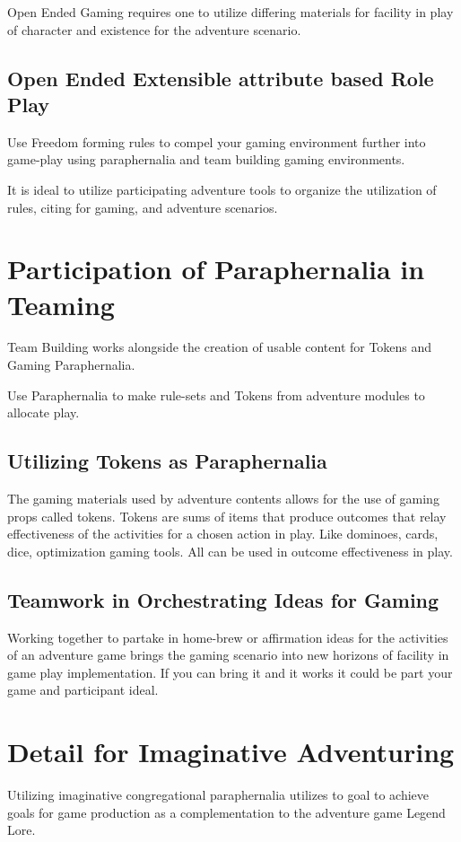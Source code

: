 \documentclass{article}
\begin{document}
Open Ended Gaming requires one to utilize differing materials for facility in play of character and existence for the adventure scenario.

\subsection{Open Ended Extensible attribute based Role Play}

Use Freedom forming rules to compel your gaming environment further into game-play using paraphernalia   and team building gaming environments.

It is ideal to utilize participating adventure tools to organize the utilization of rules, citing for gaming, and adventure scenarios.

\section{Participation of Paraphernalia in Teaming}

Team Building works alongside the creation of usable content for Tokens and Gaming Paraphernalia.

Use Paraphernalia to make rule-sets and Tokens from adventure modules to allocate play.

\subsection{Utilizing Tokens as Paraphernalia}

The gaming materials used by adventure contents allows for the use of gaming props called tokens. Tokens are sums of items that produce outcomes that relay effectiveness of the activities for a chosen action in play. Like dominoes, cards, dice, optimization gaming tools. All can be used in outcome effectiveness in play.

\subsection{Teamwork in Orchestrating Ideas for Gaming}
Working together to partake in home-brew or affirmation ideas for the activities of an adventure game brings the gaming scenario into new horizons of facility in game play implementation. If you can bring it and it works it could be part your game and participant ideal.

\section{Detail for Imaginative Adventuring}
Utilizing imaginative congregational paraphernalia utilizes to goal to achieve goals for game production as a complementation to the adventure game Legend Lore.
\end{document}
